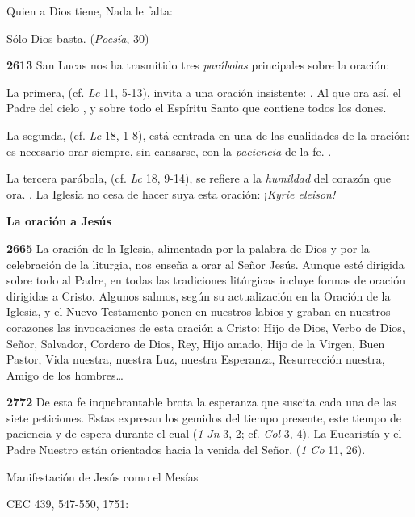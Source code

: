 \begin{body}
\begin{body}
Quien a Dios tiene, Nada le falta:

Sólo Dios basta. (\emph{Poesía}, 30)

\textbf{2613} San Lucas nos ha trasmitido tres \emph{parábolas} principales sobre la oración:

La primera,  (cf. \emph{Lc} 11, 5-13), invita a una oración insistente: . Al que ora así, el Padre del cielo , y sobre todo el Espíritu Santo que contiene todos los dones.

La segunda,  (cf. \emph{Lc} 18, 1-8), está centrada en una de las cualidades de la oración: es necesario orar siempre, sin cansarse, con la \emph{paciencia} de la fe. .

La tercera parábola,  (cf. \emph{Lc} 18, 9-14), se refiere a la \emph{humildad} del corazón que ora. . La Iglesia no cesa de hacer suya esta oración: ¡\emph{Kyrie eleison!}

\textbf{La oración a Jesús}

\textbf{2665} La oración de la Iglesia, alimentada por la palabra de Dios y por la celebración de la liturgia, nos enseña a orar al Señor Jesús. Aunque esté dirigida sobre todo al Padre, en todas las tradiciones litúrgicas incluye formas de oración dirigidas a Cristo. Algunos salmos, según su actualización en la Oración de la Iglesia, y el Nuevo Testamento ponen en nuestros labios y graban en nuestros corazones las invocaciones de esta oración a Cristo: Hijo de Dios, Verbo de Dios, Señor, Salvador, Cordero de Dios, Rey, Hijo amado, Hijo de la Virgen, Buen Pastor, Vida nuestra, nuestra Luz, nuestra Esperanza, Resurrección nuestra, Amigo de los hombres\ldots{}

\textbf{2772} De esta fe inquebrantable brota la esperanza que suscita cada una de las siete peticiones. Estas expresan los gemidos del tiempo presente, este tiempo de paciencia y de espera durante el cual  (\emph{1 Jn} 3, 2; cf. \emph{Col} 3, 4). La Eucaristía y el Padre Nuestro están orientados hacia la venida del Señor,  (\emph{1 Co} 11, 26).

Manifestación de Jesús como el Mesías

CEC 439, 547-550, 1751:


\end{body}
\end{body}
